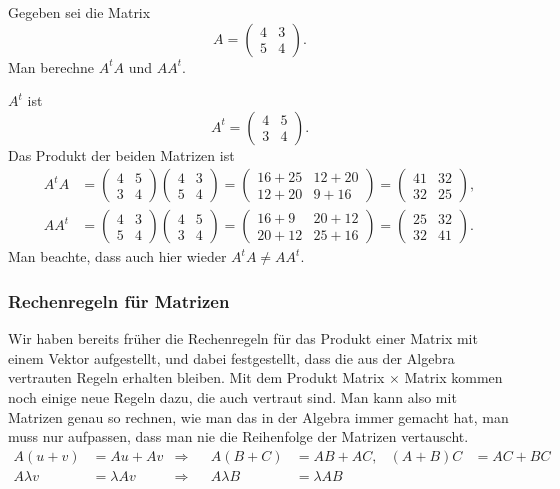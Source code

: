\begin{beispiel}
Gegeben sei die Matrix
\[
A=\begin{pmatrix}
4&3\\
5&4
\end{pmatrix}.
\]
Man berechne $A^tA$ und $AA^t$.

\smallskip

{\parindent 0pt $A^t$ ist}
\[
A^t=\begin{pmatrix}
4&5\\
3&4
\end{pmatrix}.
\]
Das Produkt der beiden Matrizen ist
\begin{align*}
A^tA&=
\begin{pmatrix}
4&5\\
3&4
\end{pmatrix}
\begin{pmatrix}
4&3\\
5&4
\end{pmatrix}
=\begin{pmatrix}
16+25&12+20\\
12+20&9+16
\end{pmatrix}
=
\begin{pmatrix}
41&32\\
32&25
\end{pmatrix},
\\
AA^t&=
\begin{pmatrix}
4&3\\
5&4
\end{pmatrix}
\begin{pmatrix}
4&5\\
3&4
\end{pmatrix}
=
\begin{pmatrix}
16+9&20+12\\
20+12&25+16
\end{pmatrix}
=
\begin{pmatrix}
25&32\\
32&41
\end{pmatrix}.
\end{align*}
Man beachte, dass auch hier wieder $A^tA\ne AA^t$.
\end{beispiel}

\subsubsection{Rechenregeln für Matrizen}
Wir haben bereits früher die Rechenregeln für das Produkt einer Matrix
mit einem Vektor aufgestellt, und dabei festgestellt, dass die
aus der Algebra vertrauten Regeln erhalten bleiben.
Mit dem
Produkt Matrix $\times$ Matrix kommen noch einige neue Regeln dazu,
die auch vertraut sind.
Man kann also mit Matrizen genau so rechnen,
wie man das in der Algebra immer gemacht hat, man muss nur
aufpassen, dass man nie die Reihenfolge der Matrizen vertauscht.
\begin{align*}
    A(u+v)&=Au+Av     &\Rightarrow&&A(B+C)&=AB+AC,    &(A+B)C&=AC+BC\\
A\lambda v&=\lambda Av&\Rightarrow&&A\lambda B&=\lambda AB
\end{align*}


